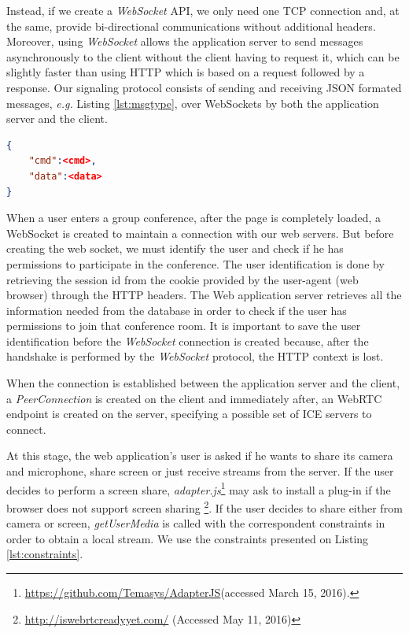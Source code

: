 Instead, if we create a \emph{WebSocket} \ac{API}, we only need one \ac{TCP} connection and, at the same, provide bi-directional communications without additional headers. Moreover, using \emph{WebSocket} allows the application server to send messages asynchronously to the client without the client having to request it, which can be slightly faster than using \ac{HTTP} which is based on a request followed by a response.
Our signaling protocol consists of sending and receiving \ac{JSON} formated messages, \emph{e.g.} Listing \ref{lst:msgtype}, over WebSockets by both the application server and the client. 

\begin{minipage}{\linewidth}
\begin{lstlisting}[caption={General structure of our WebSocket messages},label={lst:msgtype},language=json]
{
	"cmd":<cmd>,
	"data":<data>
}
\end{lstlisting}
\end{minipage}

When a user enters a group conference, after the page is completely loaded, a WebSocket is created to maintain a connection with our web servers. 
But before creating the web socket, we must identify the user and check if he has permissions to participate in the conference. The user identification is done by retrieving the session id from the cookie provided by the user-agent (web browser) through the \ac{HTTP} headers.
The Web application server retrieves all the information needed from the database in order to check if the user has permissions to join that conference room. It is important to save the user identification before the \emph{WebSocket} connection is created because, after the handshake is performed by the \emph{WebSocket} protocol\cite{rfc6455}, the \ac{HTTP} context is lost.

When the connection is established between the application server and the client, a \emph{PeerConnection} is created on the client and immediately after, an \ac{WebRTC} endpoint is created on the server, specifying a possible set of \ac{ICE} servers to connect.

At this stage, the web application's user is asked if he wants to share its camera and microphone, share screen or just receive streams from the server. If the user decides to perform a screen share, \emph{adapter.js}\footnote{\url{https://github.com/Temasys/AdapterJS}(accessed March 15, 2016).} may ask to install a plug-in if the browser does not support screen sharing \footnote{\url{http://iswebrtcreadyyet.com/} (Accessed May 11, 2016)}.
If the user decides to share either from camera or screen, \emph{getUserMedia} is called with the correspondent constraints in order to obtain a local stream. We use the constraints presented on Listing \ref{lst:constraints}. 

